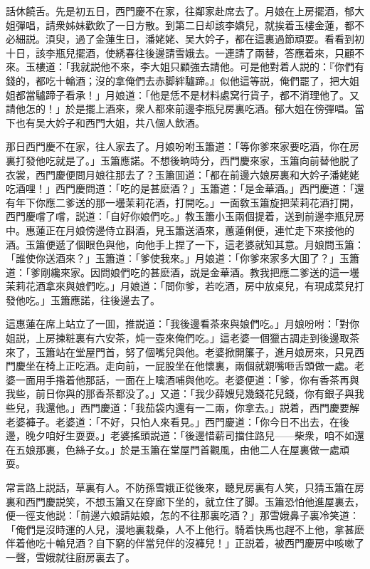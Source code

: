 話休饒舌。先是初五日，西門慶不在家，往鄰家赴席去了。月娘在上房擺酒，郁大姐彈唱，請衆姊妹歡飲了一日方散。到第二日却該李嬌兒，就挨着玉樓金蓮，都不必細説。湏臾，過了金蓮生日，潘姥姥、吴大妗子，都在這裏過節頑耍。看看到初十日，該李瓶兒擺酒，使綉春往後邊請雪娥去。一連請了兩替，答應着來，只顧不來。玉樓道：「我就説他不來，李大姐只顧強去請他。可是他對着人説的：『你們有錢的，都吃十輪酒；沒的拿俺們去赤脚絆驢蹄。』似他這等説，俺們罷了，把大姐姐都當驢蹄子看承！」月娘道：「他是恁不是材料處窝行貨子，都不消理他了。又請他怎的！」於是擺上酒來，衆人都來前邊李瓶兒房裏吃酒。郁大姐在傍彈唱。當下也有吴大妗子和西門大姐，共八個人飲酒。

那日西門慶不在家，往人家去了。月娘吩咐玉簫道：「等你爹來家要吃酒，你在房裏打發他吃就是了。」玉簫應諾。不想後晌時分，西門慶來家，玉簫向前替他脱了衣裳，西門慶便問月娘往那去了？玉簫囬道：「都在前邊六娘房裏和大妗子潘姥姥吃酒哩！」西門慶問道：「吃的是甚麽酒？」玉簫道：「是金華酒。」西門慶道：「還有年下你應二爹送的那一壜茉莉花酒，打開吃。」一面敎玉簫旋把茉莉花酒打開，西門慶嚐了嚐，説道：「自好你娘們吃。」教玉簫小玉兩個提着，送到前邊李瓶兒房中。惠蓮正在月娘傍邊侍立斟酒，見玉簫送酒來，蕙蓮俐便，連忙走下來接他的酒。玉簫便遞了個眼色與他，向他手上捏了一下，這老婆就知其意。月娘問玉簫：「誰使你送酒來？」玉簫道：「爹使我來。」月娘道：「你爹來家多大囬了？」玉簫道：「爹剛纔來家。因問娘們吃的甚麽酒，説是金華酒。教我把應二爹送的這一壜茉莉花酒拿來與娘們吃。」月娘道：「問你爹，若吃酒，房中放桌兒，有現成菜兒打發他吃。」玉簫應諾，往後邊去了。

這惠蓮在席上站立了一囬，推説道：「我後邊看茶來與娘們吃。」月娘吩咐：「對你姐説，上房揀粧裏有六安茶，炖一壺來俺們吃。」這老婆一個獵古調走到後邊取茶來了，玉簫站在堂屋門首，努了個嘴兒與他。老婆掀開簾子，進月娘房來，只見西門慶坐在椅上正吃酒。走向前，一屁股坐在他懷裏，兩個就親嘴咂舌頭做一處。老婆一面用手揝着他那話，一面在上噙酒哺與他吃。老婆便道：「爹，你有香茶再與我些，前日你與的那香茶都没了。」又道：「我少薛嫂兒幾錢花兒錢，你有銀子與我些兒，我還他。」西門慶道：「我茄袋内還有一二兩，你拿去。」説着，西門慶要解老婆褲子。老婆道：「不好，只怕人來看見。」西門慶道：「你今日不出去，在後邊，晚夕咱好生耍耍。」老婆搖頭説道：「後邊惜薪司擋住路兒——柴衆，咱不如還在五娘那裏，色絲子女。」於是玉簫在堂屋門首觀風，由他二人在屋裏做一處頑耍。

常言路上説話，草裏有人。不防孫雪娥正從後來，聽見房裏有人笑，只猜玉簫在房裏和西門慶説笑，不想玉簫又在穿廊下坐的，就立住了脚。玉簫恐怕他進屋裏去，便一徑支他説：「前邊六娘請姑娘，怎的不往那裏吃酒？」那雪娥鼻子裏冷笑道：「俺們是沒時運的人兒，漫地裏栽桑，人不上他行。騎着快馬也趕不上他，拿甚麽伴着他吃十輪兒酒？自下窮的伴當兒伴的沒褲兒！」正説着，被西門慶房中咳嗽了一聲，雪娥就往廚房裏去了。


